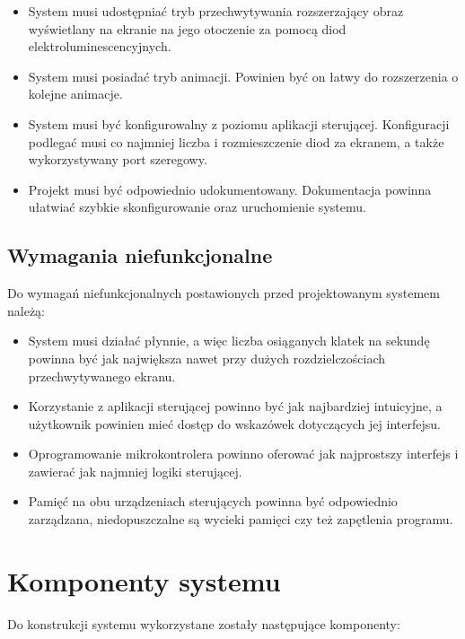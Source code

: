 \documentclass[12pt]{report}
\begin{document}
\begin{itemize}
\item System musi udostępniać tryb przechwytywania rozszerzający obraz wyświetlany na ekranie na jego otoczenie za pomocą diod elektroluminescencyjnych.
\item System musi posiadać tryb animacji. Powinien być on łatwy do rozszerzenia o kolejne animacje.
\item System musi być konfigurowalny z poziomu aplikacji sterującej. Konfiguracji podlegać musi co najmniej liczba i rozmieszczenie diod za ekranem, a także wykorzystywany port szeregowy.
\item Projekt musi być odpowiednio udokumentowany. Dokumentacja powinna ułatwiać szybkie skonfigurowanie oraz uruchomienie systemu.
\end{itemize}

\subsection{Wymagania niefunkcjonalne}

Do wymagań niefunkcjonalnych postawionych przed projektowanym systemem należą:

\begin{itemize}
\item System musi działać płynnie, a więc liczba osiąganych klatek na sekundę powinna być jak największa nawet przy dużych rozdzielczościach przechwytywanego ekranu.
\item Korzystanie z aplikacji sterującej powinno być jak najbardziej intuicyjne, a użytkownik powinien mieć dostęp do wskazówek dotyczących jej interfejsu.
\item Oprogramowanie mikrokontrolera powinno oferować jak najprostszy interfejs i zawierać jak najmniej logiki sterującej.
\item Pamięć na obu urządzeniach sterujących powinna być odpowiednio zarządzana, niedopuszczalne są wycieki pamięci czy też zapętlenia programu.
\end{itemize}

\section{Komponenty systemu} \label{komp}

Do konstrukcji systemu wykorzystane zostały następujące komponenty:
\end{document}
